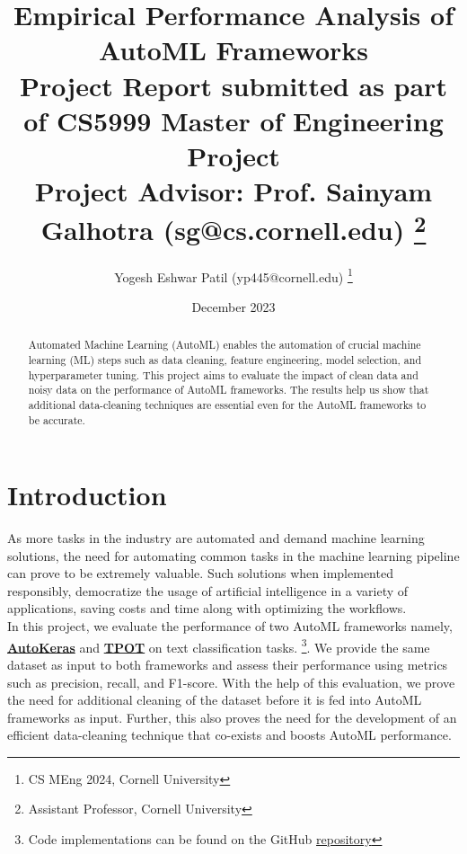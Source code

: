 \documentclass{article}
\title{
    Empirical Performance Analysis of AutoML Frameworks \\
    \large Project Report submitted as part of CS5999 Master of Engineering Project \\
    \large \textbf{Project Advisor: Prof. Sainyam Galhotra (sg@cs.cornell.edu) \footnote{Assistant Professor, Cornell University}}
    }
\author{Yogesh Eshwar Patil (yp445@cornell.edu) \footnote{CS MEng 2024, Cornell University}}
\date{December 2023}
\begin{document}
\maketitle

\begin{abstract}
Automated Machine Learning (AutoML) enables the automation of crucial machine learning (ML) steps such as data cleaning, feature engineering, model selection, and hyperparameter tuning. This project aims to evaluate the impact of clean data and noisy data on the performance of AutoML frameworks. The results help us show that additional data-cleaning techniques are essential even for the AutoML frameworks to be accurate. 
\end{abstract}

\section{Introduction}
As more tasks in the industry are automated and demand machine learning solutions, the need for automating common tasks in the machine learning pipeline can prove to be extremely valuable. Such solutions when implemented responsibly, democratize the usage of artificial intelligence in a variety of applications, saving costs and time along with optimizing the workflows. \\
In this project, we evaluate the performance of two AutoML frameworks namely, \textbf{\href{https://autokeras.com/)}{AutoKeras}} and \textbf{\href{https://epistasislab.github.io/tpot/}{TPOT}} on text classification tasks. \footnote{Code implementations can be found on the GitHub \href{https://github.com/CornellDB/AutoMLDataPrep}{repository}}. We provide the same dataset as input to both frameworks and assess their performance using metrics such as precision, recall, and F1-score. With the help of this evaluation, we prove the need for additional cleaning of the dataset before it is fed into AutoML frameworks as input. Further, this also proves the need for the development of an efficient data-cleaning technique that co-exists and boosts AutoML performance. 
\end{document}
